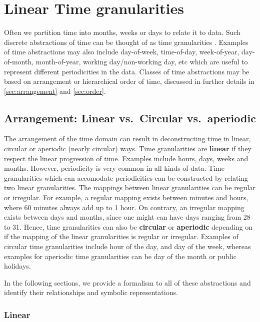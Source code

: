 \documentclass[12pt]{article}
\begin{document}
\hypertarget{sec:timegrandef}{%
\section{Linear Time granularities}\label{sec:timegrandef}}

Often we partition time into months, weeks or days to relate it to data.
Such discrete abstractions of time can be thought of as time
granularities \citep{aigner2011visualization}. Examples of time
abstractions may also include day-of-week, time-of-day, week-of-year,
day-of-month, month-of-year, working day/non-working day, etc which are
useful to represent different periodicities in the data. Classes of time
abstractions may be based on arrangement or hierarchical order of time,
discussed in further details in \autoref{sec:arrangement} and
\autoref{sec:order}.

\hypertarget{sec:arrangement}{%
\subsection{Arrangement: Linear vs.~Circular
vs.~aperiodic}\label{sec:arrangement}}

The arrangement of the time domain can result in deconstructing time in
linear, circular or aperiodic (nearly circular) ways. Time granularities
are \textbf{linear} if they respect the linear progression of time.
Examples include hours, days, weeks and months. However, periodicity is
very common in all kinds of data. Time granularities which can
accomodate periodicities can be constructed by relating two linear
granularities. The mappings between linear granularities can be regular
or irregular. For example, a regular mapping exists between minutes and
hours, where 60 minutes always add up to 1 hour. On contrary, an
irregular mapping exists between days and months, since one might can
have days ranging from 28 to 31. Hence, time granularities can also be
\textbf{circular} or \textbf{aperiodic} depending on if the mapping of
the linear granularities is regular or irregular. Examples of circular
time granularities include hour of the day, and day of the week, whereas
examples for aperiodic time granularities can be day of the month or
public holidays.

In the following sections, we provide a formalism to all of these
abstractions and identify their relationships and symbolic
representations.

\hypertarget{sec:linear-gran-def}{%
\subsubsection{Linear}\label{sec:linear-gran-def}}
\end{document}
